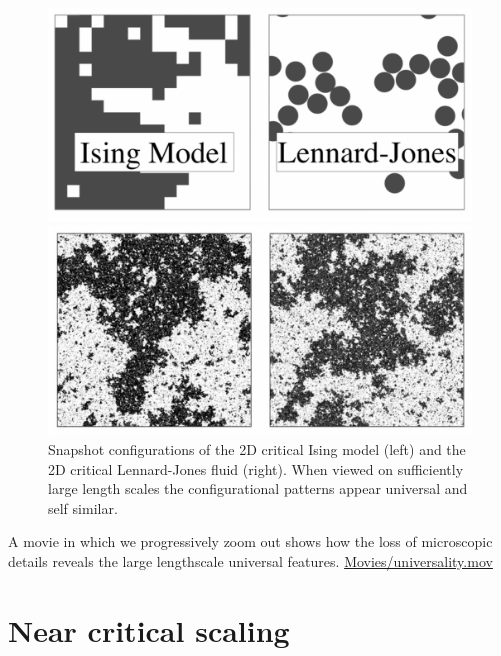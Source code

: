 \documentclass[
  letterpaper,
  enabledeprecatedfontcommands]{report}
\begin{document}
\begin{figure}

\begin{minipage}{\linewidth}

\includegraphics[width=0.5\linewidth,height=\textheight,keepaspectratio]{phase-transitions/Figs/fluid-magnet.png}

\end{minipage}%
\newline
\begin{minipage}{\linewidth}

\includegraphics[width=0.5\linewidth,height=\textheight,keepaspectratio]{phase-transitions/Figs/fluid-magnet2.png}

\end{minipage}%

\caption{\label{fig-confscomp}Snapshot configurations of the 2D critical
Ising model (left) and the 2D critical Lennard-Jones fluid (right). When
viewed on sufficiently large length scales the configurational patterns
appear universal and self similar.}

\end{figure}%

A movie in which we progressively zoom out shows how the loss of
microscopic details reveals the large lengthscale universal features.
\url{Movies/universality.mov}

\section{Near critical scaling}\label{near-critical-scaling}
\end{document}
